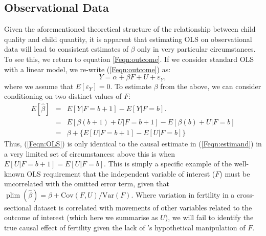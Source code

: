 \documentclass{article}
\DeclareMathOperator{\plim}{plim}
\newcommand{\Var}{\mathrm{Var}}
\newcommand{\Cov}{\mathrm{Cov}}
\begin{document}
\begin{spacing}{1.4}
\subsection{Observational Data}
Given the aforementioned theoretical structure of the relationship between 
child quality and child quantity, it is apparent that estimating OLS on 
observational data will lead to consistent estimates of $\beta$ only in very
particular circumstances. To see this, we return to equation \ref{Feqn:outcome}.
If we consider standard OLS with a linear model, we re-write 
(\ref{Feqn:outcome}) as:
\[
Y=\alpha + \beta F + U + \varepsilon_Y,
\]
where we assume that $E[\varepsilon_Y]=0$.  To estimate $\beta$ from
the above, we can consider conditioning on two distinct values of $F$:
\begin{eqnarray}
E[\hat\beta] & = & E[Y|F=b+1]-E[Y|F=b]. \label{Feqn:OLS} \\
                      & = & E[\beta(b+1)+U|F=b+1] - E[\beta(b)+U|F=b] 
\nonumber \\
                      & = & \beta + \{E[U|F=b+1] - E[U|F=b]\} \nonumber
\end{eqnarray}
Thus, (\ref{Feqn:OLS}) is only identical to the causal estimate in 
(\ref{Feqn:estimand}) in a very limited set of circumstances: above this is when
$E[U|F=b+1] = E[U|F=b]$.  This is simply a specific example of 
the well-known OLS requirement that the independent variable of interest ($F$) 
must be uncorrelated with the omitted error term, given that 
$\plim(\hat\beta)=\beta+\Cov(F,U)/\Var(F)$.  Where variation in fertility
in a cross-sectional dataset is correlated with movements of other variables
related to the outcome of interest (which here we summarise as $U$), we will fail 
to identify the true causal effect of fertility given the lack of 
\citeauthor{Haavelmo1943}'s hypothetical manipulation of $F$. 


\end{spacing}
\end{document}
